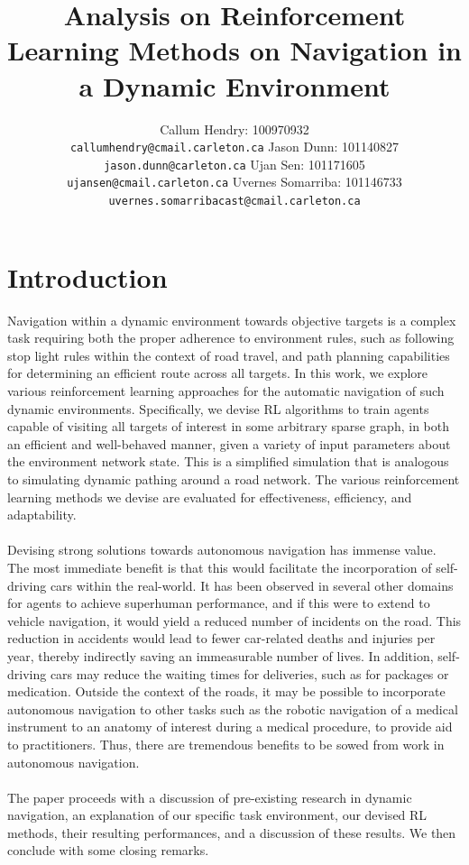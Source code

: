 \documentclass{article}
\title{Analysis on Reinforcement Learning Methods on Navigation in a Dynamic Environment}
\author{
	Callum Hendry: 100970932\\
	\texttt{callumhendry@cmail.carleton.ca}
	\And
	Jason Dunn: 101140827\\
	\texttt{jason.dunn@carleton.ca}
	\And
	Ujan Sen: 101171605\\
	\texttt{ujansen@cmail.carleton.ca}
	\And
	Uvernes Somarriba: 101146733\\
	\texttt{uvernes.somarribacast@cmail.carleton.ca}
}
\begin{document}
	
	
	\maketitle
	
	\section{Introduction}
	Navigation within a dynamic environment towards objective targets is a complex task requiring both the proper adherence to environment rules, such as following stop light rules within the context of road travel, and path planning capabilities for determining an efficient route across all targets. In this work, we explore various reinforcement learning approaches for the automatic navigation of such dynamic environments. Specifically, we devise RL algorithms to train agents capable of visiting all targets of interest in some arbitrary sparse graph, in both an efficient and well-behaved manner, given a variety of input parameters about the environment network state. This is a simplified simulation that is analogous to simulating dynamic pathing around a road network. The various reinforcement learning methods we devise are evaluated for effectiveness, efficiency, and adaptability.
	\\ \\
	Devising strong solutions towards autonomous navigation has immense value. The most immediate benefit is that this would facilitate the incorporation of self-driving cars within the real-world. It has been observed in several other domains for agents to achieve superhuman performance, and if this were to extend to vehicle navigation, it would yield a reduced number of incidents on the road. This reduction in accidents would lead to fewer car-related deaths and injuries per year, thereby indirectly saving an immeasurable number of lives. In addition, self-driving cars may reduce the waiting times for deliveries, such as for packages or medication. Outside the context of the roads, it may be possible to incorporate autonomous navigation to other tasks such as the robotic navigation of a medical instrument to an anatomy of interest during a medical procedure, to provide aid to practitioners. Thus, there are tremendous benefits to be sowed from work in autonomous navigation. 
	\\ \\
	The paper proceeds with a discussion of pre-existing research in dynamic navigation, an explanation of our specific task environment, our devised RL methods, their resulting performances, and a discussion of these results. We then conclude with some closing remarks.
	
\end{document}
